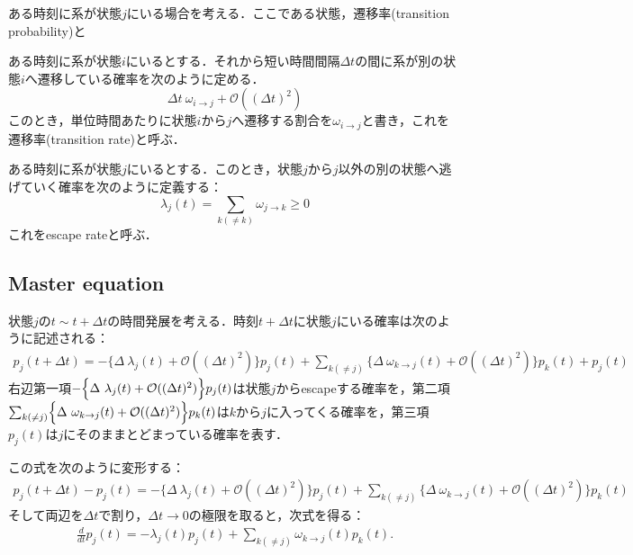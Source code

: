 ある時刻に系が状態$j$にいる場合を考える．ここである状態，遷移率(transition probability)と
\begin{kotak}
	\begin{definition}
	ある時刻に系が状態$i$にいるとする．それから短い時間間隔$\Delta t$の間に系が別の状態$i$へ遷移している確率を次のように定める．
	\begin{equation}
	    \Delta t\ \omega_{i\to j} + \mathcal{O}((\Delta t)^2)
	\end{equation}
	このとき，単位時間あたりに状態$i$から$j$へ遷移する割合を$\omega_{i\to j}$と書き，これを遷移率(transition rate)と呼ぶ．
	\end{definition}
\end{kotak}
\begin{kotak}
	\begin{definition}
	ある時刻に系が状態$j$にいるとする．このとき，状態$j$から$j$以外の別の状態へ逃げていく確率を次のように定義する：
	\begin{equation}
	    \lambda_j(t) = \sum_{k(\neq k)}\omega_{j\to k} \geq 0
	\end{equation}
	これをescape rateと呼ぶ．
	\end{definition}
\end{kotak}

\subsection{Master equation}
状態$j$の$t\sim t+\Delta t$の時間発展を考える．時刻$t+\Delta t$に状態$j$にいる確率は次のように記述される：
\begin{align}
    p_j(t+\Delta t) 
    = -\Biggl\{
    \Delta\ \lambda_j(t) + \mathcal{O}((\Delta t)^2)
    \Biggr\}p_j(t)
    +\sum_{k(\neq j)}
    \Biggl\{
    \Delta\ \omega_{k\to j}(t) + \mathcal{O}((\Delta t)^2)
    \Biggr\}p_k(t)
    +p_j(t)
\end{align}
右辺第一項$-\Bigl\{\Delta\ \lambda_j(t) + \mathcal{O}((\Delta t)^2)\Bigr\}p_j(t)$は状態$j$からescapeする確率を，第二項$\sum_{k(\neq j)}\Bigl\{\Delta\ \omega_{k\to j}(t) + \mathcal{O}((\Delta t)^2)
\Bigr\}p_k(t)$は$k$から$j$に入ってくる確率を，第三項$p_j(t)$は$j$にそのままとどまっている確率を表す．

この式を次のように変形する：
\begin{align}
    p_j(t+\Delta t) - p_j(t)
    = -\Biggl\{
    \Delta\ \lambda_j(t) + \mathcal{O}((\Delta t)^2)
    \Biggr\}p_j(t)
    +\sum_{k(\neq j)}
    \Biggl\{
    \Delta\ \omega_{k\to j}(t) + \mathcal{O}((\Delta t)^2)
    \Biggr\}p_k(t)
\end{align}
そして両辺を$\Delta t$で割り，$\Delta t \to 0$の極限を取ると，次式を得る：
\begin{align}\label{master_equation}
    \frac{d}{dt}p_j(t)
    = -\lambda_j(t)p_j(t)
    +\sum_{k(\neq j)}\omega_{k\to j}(t) p_k(t).
\end{align}

